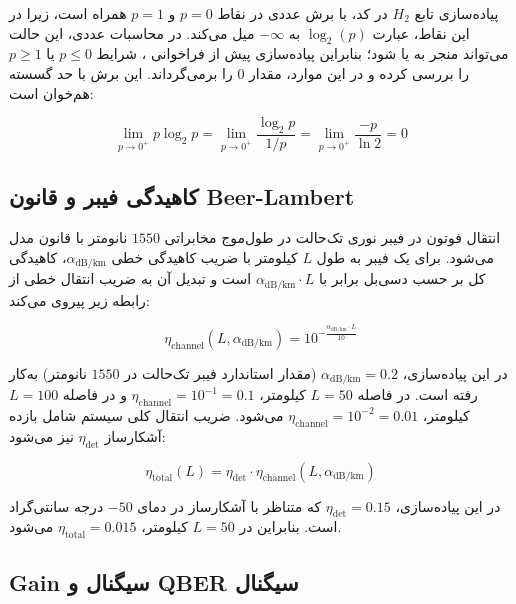 پیاده‌سازی تابع $H_2$ در کد، با برش عددی در نقاط $p = 0$ و $p = 1$ همراه است، زیرا در این نقاط، عبارت $\log_2(p)$ به $-\infty$ میل می‌کند. در محاسبات عددی، این حالت می‌تواند منجر به  یا  شود؛ بنابراین پیاده‌سازی پیش از فراخوانی ، شرایط $p \leq 0$ یا $p \geq 1$ را بررسی کرده و در این موارد، مقدار $0$ را برمی‌گرداند. این برش با حد گسسته  هم‌خوان است:

\begin{equation}
	\lim_{p \to 0^+} p \log_2 p = \lim_{p \to 0^+} \frac{\log_2 p}{1/p} = \lim_{p \to 0^+} \frac{-p}{\ln 2} = 0
\end{equation}

\subsection{کاهیدگی فیبر و قانون Beer-Lambert}

انتقال فوتون در فیبر نوری تک‌حالت در طول‌موج مخابراتی $1550$ نانومتر با قانون  مدل می‌شود. برای یک فیبر به طول $L$ کیلومتر با ضریب کاهیدگی خطی $\alpha_{\text{dB/km}}$، کاهیدگی کل بر حسب دسی‌بل برابر با $\alpha_{\text{dB/km}} \cdot L$ است و تبدیل آن به ضریب انتقال خطی از رابطه زیر پیروی می‌کند:

\begin{equation}
	\eta_{\text{channel}}(L, \alpha_{\text{dB/km}}) = 10^{-\frac{\alpha_{\text{dB/km}} \cdot L}{10}}
\end{equation}

در این پیاده‌سازی، $\alpha_{\text{dB/km}} = 0.2$ (مقدار استاندارد فیبر تک‌حالت در $1550$ نانومتر) به‌کار رفته است. در فاصله $L = 50$ کیلومتر، $\eta_{\text{channel}} = 10^{-1} = 0.1$ و در فاصله $L = 100$ کیلومتر، $\eta_{\text{channel}} = 10^{-2} = 0.01$ می‌شود. ضریب انتقال کلی سیستم شامل بازده آشکارساز $\eta_{\text{det}}$ نیز می‌شود:

\begin{equation}
	\eta_{\text{total}}(L) = \eta_{\text{det}} \cdot \eta_{\text{channel}}(L, \alpha_{\text{dB/km}})
\end{equation}

در این پیاده‌سازی، $\eta_{\text{det}} = 0.15$ که متناظر با آشکارساز  در دمای $-50$ درجه سانتی‌گراد است. بنابراین در $L = 50$ کیلومتر، $\eta_{\text{total}} = 0.015$ می‌شود.

\subsection{Gain سیگنال و QBER سیگنال}

